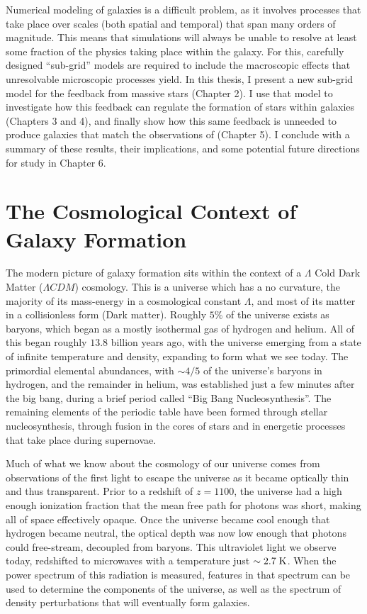 Numerical modeling of galaxies is a difficult problem, as it involves processes
that take place over scales (both spatial and temporal) that span many orders of
magnitude.  This means that simulations will always be unable to resolve at
least some fraction of the physics taking place within the galaxy.  For this,
carefully designed ``sub-grid'' models are required to include the macroscopic
effects that unresolvable microscopic processes yield.  In this thesis, I
present a new sub-grid model for the feedback from massive stars (Chapter 2).  I
use that model to investigate how this feedback can regulate the formation of
stars within galaxies (Chapters 3 and 4), and finally show how this same
feedback is unneeded to produce galaxies that match the observations of
\citet{McGaugh2016} (Chapter 5).  I conclude with a summary of these results,
their implications, and some potential future directions for study in Chapter 6.

\section{The Cosmological Context of Galaxy Formation}
The modern picture of galaxy formation sits within the context of a $\Lambda$
Cold Dark Matter  ($\Lambda CDM$) cosmology.  This is a universe which has a no
curvature, the majority of its mass-energy in a cosmological constant $\Lambda$,
and most of its matter in a collisionless form (Dark matter).  Roughly $5\%$ of
the universe exists as baryons, which began as a mostly isothermal gas of
hydrogen and helium.  All of this began roughly $13.8$ billion years ago, with
the universe emerging from a state of infinite temperature and density,
expanding to form what we see today.  The primordial elemental abundances, with
$\sim4/5$ of the universe's baryons in hydrogen, and the remainder in helium,
was established just a few minutes after the big bang, during a brief period
called ``Big Bang Nucleosynthesis''.  The remaining elements of the periodic
table have been formed through stellar nucleosynthesis, through fusion in the
cores of stars and in energetic processes that take place during supernovae.

Much of what we know about the cosmology of our universe comes from observations
of the first light to escape the universe as it became optically thin and thus
transparent.  Prior to a redshift of $z=1100$, the universe had a high enough
ionization fraction that the mean free path for photons was short, making all of
space effectively opaque.  Once the universe became cool enough that hydrogen
became neutral, the optical depth was now low enough that photons could
free-stream, decoupled from baryons.  This ultraviolet light we observe today,
redshifted to microwaves with a temperature just $\sim2.7\;\rm{K}$.  When the
power spectrum of this radiation is measured, features in that spectrum can be
used to determine the components of the universe, as well as the spectrum of
density perturbations that will eventually form galaxies.

